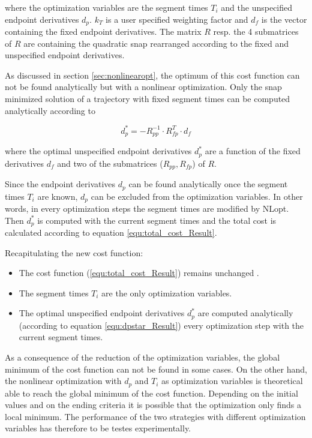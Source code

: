 where the optimization variables are the segment times $T_i$ and the unspecified endpoint derivatives $d_p$. $k_T$ is a user specified weighting factor and $d_f$ is the vector containing the fixed endpoint derivatives. The matrix $R$ resp. the 4 submatrices of $R$ are containing the quadratic snap rearranged according to the fixed and unspecified endpoint derivatives. \newline

As discussed in section \ref{sec:nonlinearopt}, the optimum of this cost function can not be found analytically but with a nonlinear optimization. Only the snap minimized solution of a trajectory with fixed segment times can be computed analytically according to 



\begin{equation}
d_p^* = - R_{pp}^{-1} \cdot R_{fp}^T \cdot d_f
\label{equ:dpstar_Result}
\end{equation}

where the optimal unspecified endpoint derivatives  $d_p^*$ are a function of the fixed derivatives $d_f$ and two of the submatrices ($R_{pp}, R_{fp}$) of $R$. \newline

Since the endpoint derivatives $d_p$ can be found analytically once the segment times $T_i$ are known, $d_p$ can be excluded from the optimization variables. In other words, in every optimization steps the segment times are modified by NLopt. Then $d_p^* $ is computed with the current segment times and the total cost is calculated according to equation \ref{equ:total_cost_Result}. \newline

Recapitulating the new cost function:

\begin{itemize}
  \item The cost function (\ref{equ:total_cost_Result}) remains unchanged .
  \item The segment times $T_i$ are the only optimization variables.
  \item The optimal unspecified endpoint derivatives $d_p^*$ are computed analytically (according to equation \ref{equ:dpstar_Result}) every optimization step with the current segment times.
\end{itemize}

As a consequence of the reduction of the optimization variables, the global minimum of the cost function can not be found in some cases. On the other hand, the nonlinear optimization with $d_p$ and $T_i$ as optimization variables is theoretical able to reach the global minimum of the cost function. Depending on the initial values and on the ending criteria it is possible that the optimization only finds a local minimum. The performance of the two strategies with different optimization variables has therefore to be testes experimentally. \newline

